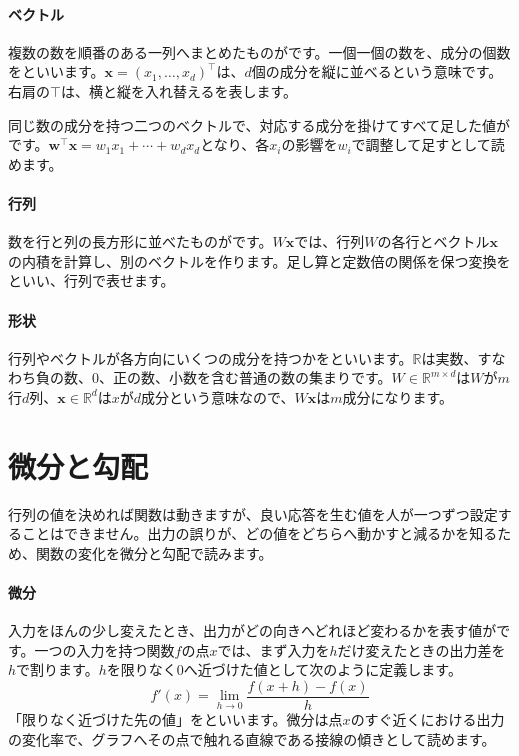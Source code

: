 \paragraph{ベクトル}
        複数の数を順番のある一列へまとめたものがです。一個一個の数を、成分の個数をといいます。$\mathbf{x}=(x_1,\ldots,x_d)^\top$は、$d$個の成分を縦に並べるという意味です。右肩の$\top$は、横と縦を入れ替えるを表します。

        同じ数の成分を持つ二つのベクトルで、対応する成分を掛けてすべて足した値がです。$\mathbf{w}^\top\mathbf{x}=w_1x_1+\cdots+w_dx_d$となり、各$x_i$の影響を$w_i$で調整して足すとして読めます。

\paragraph{行列}
        数を行と列の長方形に並べたものがです。$W\mathbf{x}$では、行列$W$の各行とベクトル$\mathbf{x}$の内積を計算し、別のベクトルを作ります。足し算と定数倍の関係を保つ変換をといい、行列で表せます。

\paragraph{形状}
        行列やベクトルが各方向にいくつの成分を持つかをといいます。$\mathbb{R}$は実数、すなわち負の数、0、正の数、小数を含む普通の数の集まりです。$W\in\mathbb{R}^{m\times d}$は$W$が$m$行$d$列、$\mathbf{x}\in\mathbb{R}^{d}$は$x$が$d$成分という意味なので、$W\mathbf{x}$は$m$成分になります。

\par
\endgroup
\par
\endgroup


\section{微分と勾配}
\label{sec:06-machine-learning-02}

行列の値を決めれば関数は動きますが、良い応答を生む値を人が一つずつ設定することはできません。出力の誤りが、どの値をどちらへ動かすと減るかを知るため、関数の変化を微分と勾配で読みます。

\begingroup
\begingroup
\paragraph{微分}
        入力をほんの少し変えたとき、出力がどの向きへどれほど変わるかを表す値がです。一つの入力を持つ関数$f$の点$x$では、まず入力を$h$だけ変えたときの出力差を$h$で割ります。$h$を限りなく0へ近づけた値として次のように定義します。
        \[
          f'(x)=\lim_{h\to0}\frac{f(x+h)-f(x)}{h}
        \]
        「限りなく近づけた先の値」をといいます。微分は点$x$のすぐ近くにおける出力の変化率で、グラフへその点で触れる直線である接線の傾きとして読めます。

